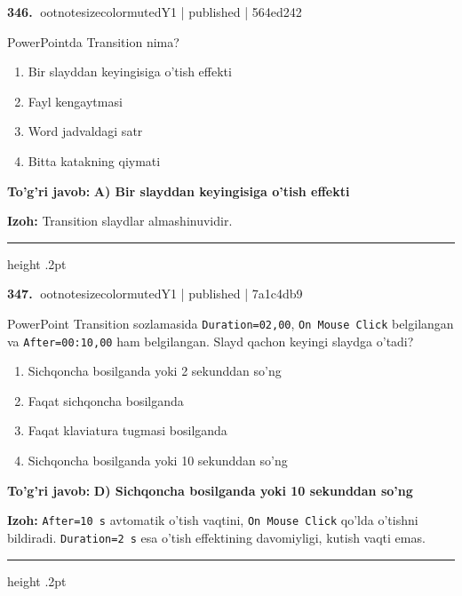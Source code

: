 \documentclass[10pt,a4paper]{article}
\begin{document}
\textbf{\color{ink}346.} {ootnotesizecolor{muted}Y1 | published | 564ed242}
\par
PowerPointda Transition nima?
\begin{enumerate}[label=\Alph*),leftmargin=9mm]
\item Bir slayddan keyingisiga o'tish effekti
\item Fayl kengaytmasi
\item Word jadvaldagi satr
\item Bitta katakning qiymati
\end{enumerate}
\begin{tcolorbox}[enhanced,breakable,colback=teal!4,colframe=teal!55!black,boxrule=0.45pt,arc=1.2mm,left=2.8mm,right=2.8mm,top=2mm,bottom=2mm]
\textbf{\color{teal}To'g'ri javob:} \textbf{A) Bir slayddan keyingisiga o'tish effekti}
\par\smallskip
\textbf{Izoh:} Transition slaydlar almashinuvidir.
\end{tcolorbox}
\vspace{2mm}\hrule height .2pt\vspace{2mm}

\textbf{\color{ink}347.} {ootnotesizecolor{muted}Y1 | published | 7a1c4db9}
\par
PowerPoint Transition sozlamasida \texttt{Duration=02,00}, \texttt{On Mouse Click} belgilangan va \texttt{After=00:10,00} ham belgilangan. Slayd qachon keyingi slaydga o'tadi?
\begin{enumerate}[label=\Alph*),leftmargin=9mm]
\item Sichqoncha bosilganda yoki 2 sekunddan so'ng
\item Faqat sichqoncha bosilganda
\item Faqat klaviatura tugmasi bosilganda
\item Sichqoncha bosilganda yoki 10 sekunddan so'ng
\end{enumerate}
\begin{tcolorbox}[enhanced,breakable,colback=teal!4,colframe=teal!55!black,boxrule=0.45pt,arc=1.2mm,left=2.8mm,right=2.8mm,top=2mm,bottom=2mm]
\textbf{\color{teal}To'g'ri javob:} \textbf{D) Sichqoncha bosilganda yoki 10 sekunddan so'ng}
\par\smallskip
\textbf{Izoh:} \texttt{After=10 s} avtomatik o'tish vaqtini, \texttt{On Mouse Click} qo'lda o'tishni bildiradi. \texttt{Duration=2 s} esa o'tish effektining davomiyligi, kutish vaqti emas.
\end{tcolorbox}
\vspace{2mm}\hrule height .2pt\vspace{2mm}
\end{document}
